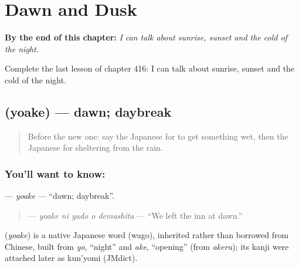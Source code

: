 
\chapter{Dawn and Dusk}
\label{ch:ja-dawn-and-dusk}

\begin{chapteropening}
\textbf{By the end of this chapter:} \emph{I can talk about sunrise, sunset and the cold of the night.}

Complete the last lesson of chapter 416: I can talk about sunrise, sunset and the cold of the night.
\end{chapteropening}

\section[\texorpdfstring{\ja{よあけ} (yoake)}{よあけ (yoake)}]{ (yoake) — dawn; daybreak}

\label{lesson:JA-C416-yoake}



\begin{quote}
Before the new one: say the Japanese for to get something wet, then the Japanese for sheltering from the rain.
\end{quote}

\subsection*{You'll want to know: }
\textbf{} — \emph{yoake} — \textquotedblleft{}dawn; daybreak\textquotedblright{}.

\begin{quote}
\textbf{  } — \emph{yoake ni yado o demashita} — \textquotedblleft{}We left the inn at dawn.\textquotedblright{}
\end{quote}

\begin{cousinweb}
\textbf{} (\emph{yoake}) is a native Japanese word (wago), inherited rather than borrowed from Chinese, built from \emph{yo}, \textquotedblleft{}night\textquotedblright{} and \emph{ake}, \textquotedblleft{}opening\textquotedblright{} (from \emph{akeru}); its kanji were attached later as kun'yomi (JMdict).
\end{cousinweb}

